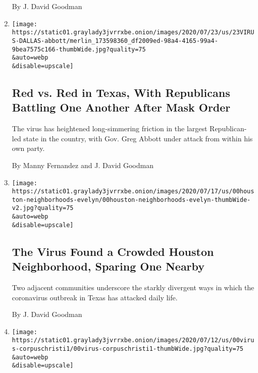\begin{enumerate}
  By J. David Goodman
\item
  \href{/2020/07/23/us/coronavirus-texas-abbott-republicans.html}{}

  \texttt{[image: https://static01.graylady3jvrrxbe.onion/images/2020/07/23/us/23VIRUS-DALLAS-abbott/merlin\_173598360\_df2009ed-98a4-4165-99a4-9bea7575c166-thumbWide.jpg?quality=75\\\&auto=webp\\\&disable=upscale]}

  \hypertarget{red-vs-red-in-texas-with-republicans-battling-one-another-after-mask-order}{%
  \subsection{Red vs. Red in Texas, With Republicans Battling One
  Another After Mask
  Order}\label{red-vs-red-in-texas-with-republicans-battling-one-another-after-mask-order}}

  The virus has heightened long-simmering friction in the largest
  Republican-led state in the country, with Gov. Greg Abbott under
  attack from within his own party.

  By Manny Fernandez and J. David Goodman
\item
  \href{/2020/07/21/us/coronavirus-houston-gulfton-bellaire.html}{}

  \texttt{[image: https://static01.graylady3jvrrxbe.onion/images/2020/07/17/us/00houston-neighborhoods-evelyn/00houston-neighborhoods-evelyn-thumbWide-v2.jpg?quality=75\\\&auto=webp\\\&disable=upscale]}

  \hypertarget{the-virus-found-a-crowded-houston-neighborhood-sparing-one-nearby}{%
  \subsection{The Virus Found a Crowded Houston Neighborhood, Sparing
  One
  Nearby}\label{the-virus-found-a-crowded-houston-neighborhood-sparing-one-nearby}}

  Two adjacent communities underscore the starkly divergent ways in
  which the coronavirus outbreak in Texas has attacked daily life.

  By J. David Goodman
\item
  \href{/2020/07/11/us/coronavirus-texas-corpus-christi.html}{}

  \texttt{[image: https://static01.graylady3jvrrxbe.onion/images/2020/07/12/us/00virus-corpuschristi1/00virus-corpuschristi1-thumbWide.jpg?quality=75\\\&auto=webp\\\&disable=upscale]}

  \hypertarget{in-texas-beach-city-out-of-towners-drove-in-an-outbreak}{%
}
\end{enumerate}

